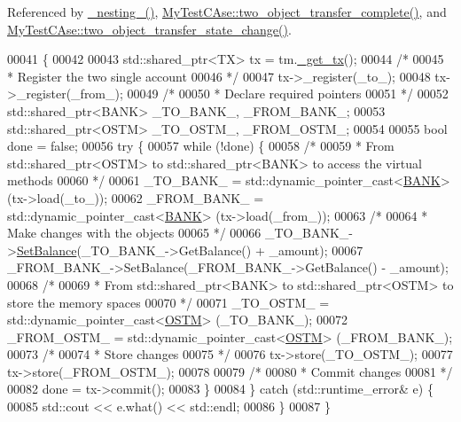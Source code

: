 Referenced by \hyperlink{client_8h_source_l00089}{\+\_\+nesting\+\_\+()}, \hyperlink{_my_test_c_ase_8cpp_source_l00748}{My\+Test\+C\+Ase\+::two\+\_\+object\+\_\+transfer\+\_\+complete()}, and \hyperlink{_my_test_c_ase_8cpp_source_l00765}{My\+Test\+C\+Ase\+::two\+\_\+object\+\_\+transfer\+\_\+state\+\_\+change()}.


\begin{DoxyCode}
00041                                                                                                            
         \{
00042 
00043     std::shared\_ptr<TX> tx = tm.\hyperlink{class_t_m_a41cb0226cc4080c931651b13f74a0075_a41cb0226cc4080c931651b13f74a0075}{\_get\_tx}();
00044     \textcolor{comment}{/*}
00045 \textcolor{comment}{     * Register the two single account}
00046 \textcolor{comment}{     */}
00047     tx->\_register(\_to\_);
00048     tx->\_register(\_from\_);
00049     \textcolor{comment}{/*}
00050 \textcolor{comment}{     * Declare required pointers }
00051 \textcolor{comment}{     */}
00052     std::shared\_ptr<BANK> \_TO\_BANK\_, \_FROM\_BANK\_;
00053     std::shared\_ptr<OSTM> \_TO\_OSTM\_, \_FROM\_OSTM\_;
00054 
00055     \textcolor{keywordtype}{bool} done = \textcolor{keyword}{false};
00056     \textcolor{keywordflow}{try} \{
00057         \textcolor{keywordflow}{while} (!done) \{
00058             \textcolor{comment}{/*}
00059 \textcolor{comment}{             * From std::shared\_ptr<OSTM> to std::shared\_ptr<BANK> to access the virtual methods}
00060 \textcolor{comment}{             */}
00061             \_TO\_BANK\_ = std::dynamic\_pointer\_cast<\hyperlink{class_b_a_n_k}{BANK}> (tx->load(\_to\_));
00062             \_FROM\_BANK\_ = std::dynamic\_pointer\_cast<\hyperlink{class_b_a_n_k}{BANK}> (tx->load(\_from\_));
00063             \textcolor{comment}{/*}
00064 \textcolor{comment}{             * Make changes with the objects}
00065 \textcolor{comment}{             */}
00066             \_TO\_BANK\_->\hyperlink{class_b_a_n_k_ae3e45b407bf8ec7175662442ea24b7c0_ae3e45b407bf8ec7175662442ea24b7c0}{SetBalance}(\_TO\_BANK\_->GetBalance() + \_amount);
00067             \_FROM\_BANK\_->SetBalance(\_FROM\_BANK\_->GetBalance() - \_amount);
00068             \textcolor{comment}{/*}
00069 \textcolor{comment}{             * From std::shared\_ptr<BANK> to std::shared\_ptr<OSTM> to store the memory spaces}
00070 \textcolor{comment}{             */}
00071             \_TO\_OSTM\_ = std::dynamic\_pointer\_cast<\hyperlink{class_o_s_t_m}{OSTM}> (\_TO\_BANK\_);
00072             \_FROM\_OSTM\_ = std::dynamic\_pointer\_cast<\hyperlink{class_o_s_t_m}{OSTM}> (\_FROM\_BANK\_);
00073             \textcolor{comment}{/*}
00074 \textcolor{comment}{             * Store changes}
00075 \textcolor{comment}{             */}
00076             tx->store(\_TO\_OSTM\_);
00077             tx->store(\_FROM\_OSTM\_);
00078 
00079             \textcolor{comment}{/*}
00080 \textcolor{comment}{             * Commit changes}
00081 \textcolor{comment}{             */}
00082             done = tx->commit();
00083         \}
00084     \} \textcolor{keywordflow}{catch} (std::runtime\_error& e) \{
00085         std::cout << e.what() << std::endl;
00086     \}
00087 \}
\end{DoxyCode}


